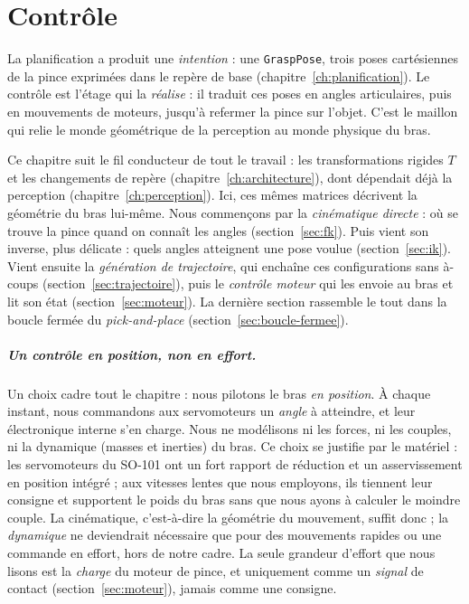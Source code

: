 \chapter{Contrôle}
\label{ch:controle}

La planification a produit une \emph{intention} : une \texttt{GraspPose}, trois poses cartésiennes de la pince exprimées dans le repère de base (chapitre~\ref{ch:planification}). Le contrôle est l'étage qui la \emph{réalise} : il traduit ces poses en angles articulaires, puis en mouvements de moteurs, jusqu'à refermer la pince sur l'objet. C'est le maillon qui relie le monde géométrique de la perception au monde physique du bras.

Ce chapitre suit le fil conducteur de tout le travail : les transformations rigides $T$ et les changements de repère (chapitre~\ref{ch:architecture}), dont dépendait déjà la perception (chapitre~\ref{ch:perception}). Ici, ces mêmes matrices décrivent la géométrie du bras lui-même. Nous commençons par la \emph{cinématique directe} : où se trouve la pince quand on connaît les angles (section~\ref{sec:fk}). Puis vient son inverse, plus délicate : quels angles atteignent une pose voulue (section~\ref{sec:ik}). Vient ensuite la \emph{génération de trajectoire}, qui enchaîne ces configurations sans à-coups (section~\ref{sec:trajectoire}), puis le \emph{contrôle moteur} qui les envoie au bras et lit son état (section~\ref{sec:moteur}). La dernière section rassemble le tout dans la boucle fermée du \emph{pick-and-place} (section~\ref{sec:boucle-fermee}).

\paragraph{Un contrôle en position, non en effort.} Un choix cadre tout le chapitre : nous pilotons le bras \emph{en position}. À chaque instant, nous commandons aux servomoteurs un \emph{angle} à atteindre, et leur électronique interne s'en charge. Nous ne modélisons ni les forces, ni les couples, ni la dynamique (masses et inerties) du bras. Ce choix se justifie par le matériel : les servomoteurs du SO-101 ont un fort rapport de réduction et un asservissement en position intégré ; aux vitesses lentes que nous employons, ils tiennent leur consigne et supportent le poids du bras sans que nous ayons à calculer le moindre couple. La cinématique, c'est-à-dire la géométrie du mouvement, suffit donc ; la \emph{dynamique} ne deviendrait nécessaire que pour des mouvements rapides ou une commande en effort, hors de notre cadre. La seule grandeur d'effort que nous lisons est la \emph{charge} du moteur de pince, et uniquement comme un \emph{signal} de contact (section~\ref{sec:moteur}), jamais comme une consigne.

